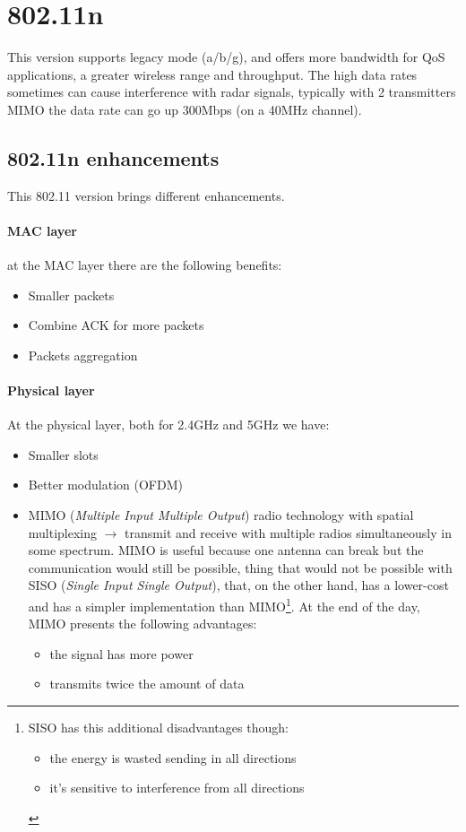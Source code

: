 \section{802.11n}

This version supports legacy mode (a/b/g), and offers more bandwidth for QoS
applications, a greater wireless range and throughput.
The high data rates sometimes can cause interference with radar signals,
typically with 2 transmitters MIMO the data rate can go up 300Mbps (on a 40MHz
channel).

\subsection{802.11n enhancements}

This 802.11 version brings different enhancements.

\paragraph*{MAC layer} at the MAC layer there are the following benefits:
\begin{itemize}
\item Smaller packets
\item Combine ACK for more packets
\item Packets aggregation
\end{itemize}

\paragraph*{Physical layer} At the physical layer, both for 2.4GHz and 5GHz we
have:
\begin{itemize}
\item Smaller slots
\item Better modulation (OFDM)
\item MIMO (\textit{Multiple Input Multiple Output}) radio technology with
spatial multiplexing $\to$ transmit and receive with multiple radios
simultaneously in some spectrum. MIMO is useful because one antenna can break
but the communication would still be possible, thing that would not be possible
with SISO (\textit{Single Input Single Output}), that, on the other hand, has a
lower-cost and has a simpler implementation than MIMO\footnote{
SISO has this additional disadvantages though:
\begin{itemize}
\item the energy is wasted sending in all directions
\item it's sensitive to interference from all directions
\end{itemize}
}. At the end of the day, MIMO presents the following advantages:
\begin{itemize}
 \item the signal has more power
 \item transmits twice the amount of data
\end{itemize}
\end{itemize}


